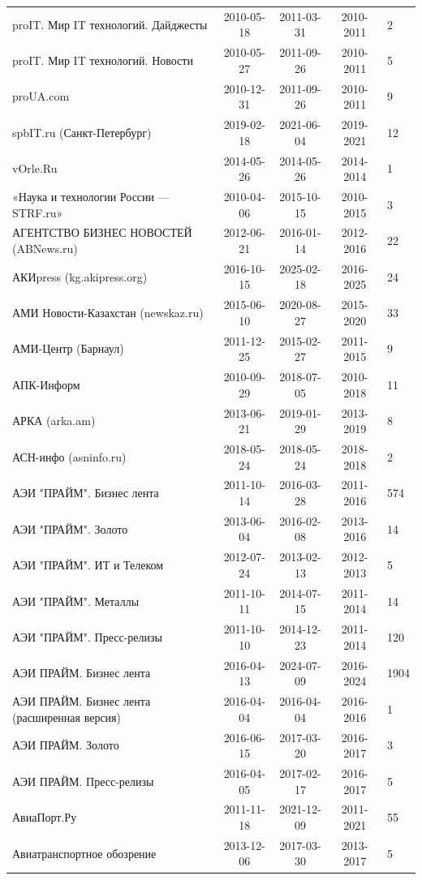 \begin{longtable}{p{6cm}cccp{2cm}}
proIT. Мир IT технологий. Дайджесты & 2010-05-18 & 2011-03-31 & 2010-2011 & 2\\
proIT. Мир IT технологий. Новости & 2010-05-27 & 2011-09-26 & 2010-2011 & 5\\
proUA.com & 2010-12-31 & 2011-09-26 & 2010-2011 & 9\\
spbIT.ru (Санкт-Петербург) & 2019-02-18 & 2021-06-04 & 2019-2021 & 12\\
vOrle.Ru & 2014-05-26 & 2014-05-26 & 2014-2014 & 1\\
«Наука и технологии России — STRF.ru» & 2010-04-06 & 2015-10-15 & 2010-2015 & 3\\
АГЕНТСТВО БИЗНЕС НОВОСТЕЙ (ABNews.ru) & 2012-06-21 & 2016-01-14 & 2012-2016 & 22\\
АКИpress (kg.akipress.org) & 2016-10-15 & 2025-02-18 & 2016-2025 & 24\\
АМИ Новости-Казахстан (newskaz.ru) & 2015-06-10 & 2020-08-27 & 2015-2020 & 33\\
АМИ-Центр (Барнаул) & 2011-12-25 & 2015-02-27 & 2011-2015 & 9\\
АПК-Информ & 2010-09-29 & 2018-07-05 & 2010-2018 & 11\\
АРКА (arka.am) & 2013-06-21 & 2019-01-29 & 2013-2019 & 8\\
АСН-инфо (asninfo.ru) & 2018-05-24 & 2018-05-24 & 2018-2018 & 2\\
АЭИ "ПРАЙМ". Бизнес лента & 2011-10-14 & 2016-03-28 & 2011-2016 & 574\\
АЭИ "ПРАЙМ". Золото & 2013-06-04 & 2016-02-08 & 2013-2016 & 14\\
АЭИ "ПРАЙМ". ИТ и Телеком & 2012-07-24 & 2013-02-13 & 2012-2013 & 5\\
АЭИ "ПРАЙМ". Металлы & 2011-10-11 & 2014-07-15 & 2011-2014 & 14\\
АЭИ "ПРАЙМ". Пресс-релизы & 2011-10-10 & 2014-12-23 & 2011-2014 & 120\\
АЭИ ПРАЙМ. Бизнес лента & 2016-04-13 & 2024-07-09 & 2016-2024 & 1904\\
АЭИ ПРАЙМ. Бизнес лента (расширенная версия) & 2016-04-04 & 2016-04-04 & 2016-2016 & 1\\
АЭИ ПРАЙМ. Золото & 2016-06-15 & 2017-03-20 & 2016-2017 & 3\\
АЭИ ПРАЙМ. Пресс-релизы & 2016-04-05 & 2017-02-17 & 2016-2017 & 5\\
АвиаПорт.Ру & 2011-11-18 & 2021-12-09 & 2011-2021 & 55\\
Авиатранспортное обозрение & 2013-12-06 & 2017-03-30 & 2013-2017 & 5\\

\end{longtable}
